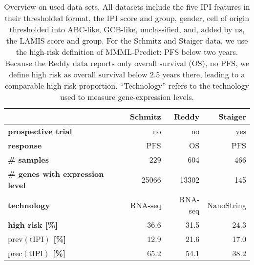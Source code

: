 \begin{table}
    \centering
    \begin{tabular}{lrrr}
        \hline
        & \textbf{Schmitz} & \textbf{Reddy} & \textbf{Staiger} \\
        \hline
        \textbf{prospective trial} & no & no & yes \\
        \textbf{response} & PFS & OS & PFS \\
        \textbf{\# samples} & \num{229} & \num{604} & \num{466} \\
        \textbf{\# genes with expression level} & \num{25066} & \num{13302} & \num{145} \\
        \textbf{technology} & RNA-seq & RNA-seq & NanoString \\
        \textbf{high risk [\%]} & \num{36.6} & \num{31.5} & \num{24.3} \\
        \textbf{$\text{prev}(\text{tIPI})$ [\%]} & \num{12.9} & \num{21.6} & \num{17.0} \\
        \textbf{$\text{prec}(\text{tIPI})$ [\%]} & \num{65.2} & \num{54.1} & \num{38.2} \\
        \hline
    \end{tabular}
    \caption{Overview on used data sets. All datasets include the five IPI features in their 
        thresholded format, the IPI score and group, gender, cell of origin thresholded into 
        ABC-like, GCB-like, unclassified, and, added 
        by us, the LAMIS score and group. For the Schmitz and Staiger data, we use the high-risk 
        definition of 
        MMML-Predict: PFS below two years. Because the Reddy data reports only overall survival 
        (OS), no PFS, we define high risk as overall survival below \num{2.5} years there, leading 
        to a comparable high-risk proportion. ``Technology'' refers to the technology used to measure 
        gene-expression levels.}
        \label{table:data}
\end{table}